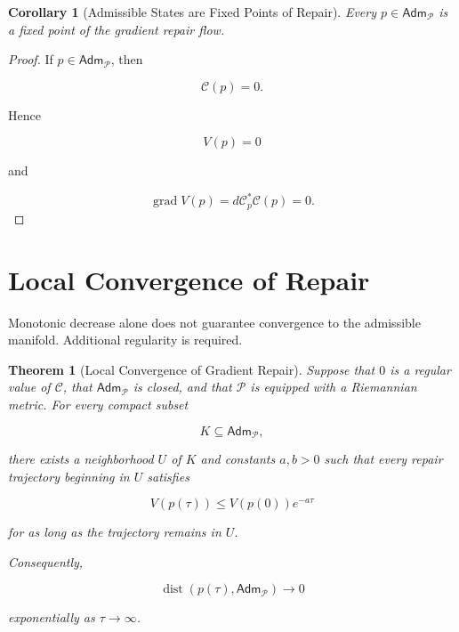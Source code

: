 \documentclass[11pt,oneside]{book}
\numberwithin{equation}{chapter}
\theoremstyle{definition}
\theoremstyle{plain}
\newtheorem{theorem}[definition]{Theorem}
\newtheorem{corollary}[definition]{Corollary}
\DeclareMathOperator{\grad}{grad}
\newcommand{\Adm}{\mathsf{Adm}}
\begin{document}
\begin{corollary}[Admissible States are Fixed Points of Repair]

Every \(p\in\Adm_{\mathcal P}\) is a fixed point of the gradient repair
flow.

\end{corollary}

\begin{proof}

If \(p\in\Adm_{\mathcal P}\), then

\[
\mathcal C(p)=0.
\]

Hence

\[
V(p)=0
\]

and

\[
\grad V(p)
=
d\mathcal C_p^{*}\mathcal C(p)
=
0.
\]

\end{proof}

\section{Local Convergence of Repair}

Monotonic decrease alone does not guarantee convergence to the admissible
manifold. Additional regularity is required.

\begin{theorem}[Local Convergence of Gradient Repair]

Suppose that \(0\) is a regular value of \(\mathcal C\), that
\(\Adm_{\mathcal P}\) is closed, and that \(\mathcal P\) is equipped with a
Riemannian metric. For every compact subset

\[
K\subseteq\Adm_{\mathcal P},
\]

there exists a neighborhood \(U\) of \(K\) and constants
\(a,b>0\) such that every repair trajectory beginning in \(U\) satisfies

\[
V(p(\tau))
\leq
V(p(0))e^{-a\tau}
\]

for as long as the trajectory remains in \(U\).

Consequently,

\[
\operatorname{dist}
\left(
p(\tau),
\Adm_{\mathcal P}
\right)
\longrightarrow
0
\]

exponentially as \(\tau\to\infty\).

\end{theorem}
\end{document}
